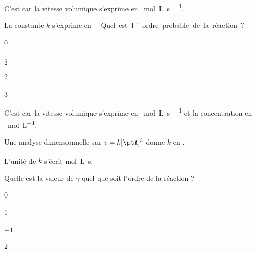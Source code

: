 \reponse{\reponseA{}}

\begin{corrige}
C'est \reponseA{} car la vitesse volumique s'exprime en \SI{}{\mol\per\liter\per\second}.
\end{corrige}




\begin{enonce}
	La constante $k$ s'exprime en \SI{}{\square\liter\square\per\mol\per\second}. 
	
	Quel est l'ordre probable de la réaction ?
	\begin{listeQCM4Colonnes}
	\item $0$
	\item $\frac{1}{2}$
	\item $2$
	\item $3$
	\end{listeQCM4Colonnes}
\end{enonce}

\reponse{\reponseD{}}

\begin{corrige}
C'est \reponseD{} car la vitesse volumique s'exprime en \SI{}{\mol\per\liter\per\second} et la concentration en \SI{}{\mol\per\liter}. 

Une analyse dimensionnelle sur $v=k[\ptA]^3$ donne $k$ en \SI{}{\square\liter\square\per\mol\per\second}.
\end{corrige}



\bigskip
L'unité de $k$ s'écrit \si{\mol^\alpha.\liter^\beta.\second^\gamma}.

\begin{enonce}
	Quelle est la valeur de $\gamma$ quel que soit l'ordre de la réaction ?
	\begin{listeQCM4Colonnes}
	\item $0$
	\item $1$
	\item $-1$
	\item $2$
	\end{listeQCM4Colonnes}
\end{enonce}

